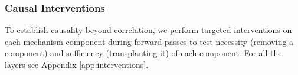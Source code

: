 \documentclass[11pt]{article}
\newif\ifResolvedcomments
\newcommand{\Resolved}[1]{\ifResolvedcomments\textcolor{green}{[Resolved: #1]}\fi}
\begin{document}
\subsubsection{Causal Interventions}
\label{sec:interventions}
To establish causality beyond correlation, we perform targeted 
interventions on each mechanism component during forward passes to test necessity (removing a component) and sufficiency (transplanting it) of each component. For all the layers see Appendix \ref{app:interventions}.

\Resolved{Now to the annoying part - we need to somehow say that this is robust and happens in many layers, so say we add more layers in the appendix and do this, it's ok if it's not as robust this experiment but people expect this info to be present. Please go after this over all the paper and think where else we need to add more experiments to the appendix.}
\end{document}
